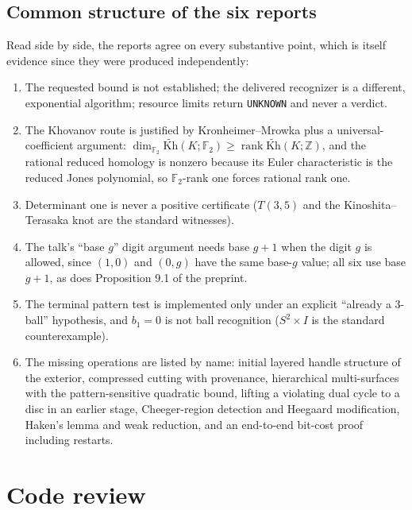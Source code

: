 \documentclass[11pt]{article}
\theoremstyle{remark}
\newcommand{\F}{\mathbb{F}_2}
\newcommand{\Kh}{\widetilde{\mathrm{Kh}}}
\newcommand{\code}[1]{\texttt{#1}}
\begin{document}
\subsection{Common structure of the six reports}
Read side by side, the reports agree on every substantive point, which is
itself evidence since they were produced independently:
\begin{enumerate}
\item The requested bound is not established; the delivered recognizer is a
  different, exponential algorithm; resource limits return \code{UNKNOWN}
  and never a verdict.
\item The Khovanov route is justified by Kronheimer--Mrowka \cite{km} plus a
  universal-coefficient argument: $\dim_{\F}\Kh(K;\F)\ge\operatorname{rank}\Kh(K;\mathbb Z)$,
  and the rational reduced homology is nonzero because its Euler
  characteristic is the reduced Jones polynomial, so $\F$-rank one forces
  rational rank one.
\item Determinant one is never a positive certificate ($T(3,5)$ and the
  Kinoshita--Terasaka knot are the standard witnesses).
\item The talk's ``base $g$'' digit argument needs base $g+1$ when the digit
  $g$ is allowed, since $(1,0)$ and $(0,g)$ have the same base-$g$ value; all
  six use base $g+1$, as does Proposition 9.1 of the preprint.
\item The terminal pattern test is implemented only under an explicit
  ``already a 3-ball'' hypothesis, and $b_1=0$ is not ball recognition
  ($S^2\times I$ is the standard counterexample).
\item The missing operations are listed by name: initial layered handle
  structure of the exterior, compressed cutting with provenance,
  hierarchical multi-surfaces with the pattern-sensitive quadratic bound,
  lifting a violating dual cycle to a disc in an earlier stage, Cheeger-region
  detection and Heegaard modification, Haken's lemma and weak reduction, and
  an end-to-end bit-cost proof including restarts.
\end{enumerate}

\section{Code review}
\end{document}
